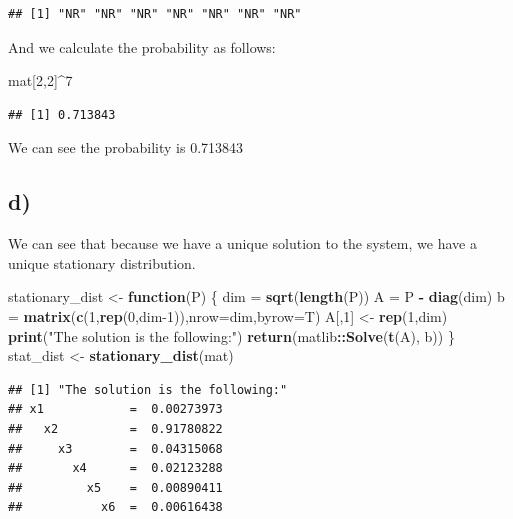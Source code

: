 \documentclass[]{article}
\newenvironment{Shaded}{\begin{snugshade}}{\end{snugshade}}
\newcommand{\ControlFlowTok}[1]{\textcolor[rgb]{0.13,0.29,0.53}{\textbf{#1}}}
\newcommand{\DataTypeTok}[1]{\textcolor[rgb]{0.13,0.29,0.53}{#1}}
\newcommand{\DecValTok}[1]{\textcolor[rgb]{0.00,0.00,0.81}{#1}}
\newcommand{\KeywordTok}[1]{\textcolor[rgb]{0.13,0.29,0.53}{\textbf{#1}}}
\newcommand{\NormalTok}[1]{#1}
\newcommand{\OperatorTok}[1]{\textcolor[rgb]{0.81,0.36,0.00}{\textbf{#1}}}
\newcommand{\StringTok}[1]{\textcolor[rgb]{0.31,0.60,0.02}{#1}}
\begin{document}
\begin{verbatim}
## [1] "NR" "NR" "NR" "NR" "NR" "NR" "NR"
\end{verbatim}

And we calculate the probability as follows:

\begin{Shaded}
\begin{Highlighting}[]
\NormalTok{mat[}\DecValTok{2}\NormalTok{,}\DecValTok{2}\NormalTok{]}\OperatorTok{^}\DecValTok{7}
\end{Highlighting}
\end{Shaded}

\begin{verbatim}
## [1] 0.713843
\end{verbatim}

We can see the probability is 0.713843

\hypertarget{d}{%
\subsection{d)}\label{d}}

We can see that because we have a unique solution to the system, we have
a unique stationary distribution.

\begin{Shaded}
\begin{Highlighting}[]
\NormalTok{stationary_dist <-}\StringTok{ }\ControlFlowTok{function}\NormalTok{(P) \{}
\NormalTok{    dim =}\StringTok{ }\KeywordTok{sqrt}\NormalTok{(}\KeywordTok{length}\NormalTok{(P))}
\NormalTok{    A =}\StringTok{ }\NormalTok{P }\OperatorTok{-}\StringTok{ }\KeywordTok{diag}\NormalTok{(dim)}
\NormalTok{    b =}\StringTok{ }\KeywordTok{matrix}\NormalTok{(}\KeywordTok{c}\NormalTok{(}\DecValTok{1}\NormalTok{,}\KeywordTok{rep}\NormalTok{(}\DecValTok{0}\NormalTok{,dim}\DecValTok{-1}\NormalTok{)),}\DataTypeTok{nrow=}\NormalTok{dim,}\DataTypeTok{byrow=}\NormalTok{T)}
\NormalTok{    A[,}\DecValTok{1}\NormalTok{] <-}\StringTok{ }\KeywordTok{rep}\NormalTok{(}\DecValTok{1}\NormalTok{,dim)}
    \KeywordTok{print}\NormalTok{(}\StringTok{"The solution is the following:"}\NormalTok{)}
    \KeywordTok{return}\NormalTok{(matlib}\OperatorTok{::}\KeywordTok{Solve}\NormalTok{(}\KeywordTok{t}\NormalTok{(A), b))}
\NormalTok{\}}
\NormalTok{stat_dist <-}\StringTok{ }\KeywordTok{stationary_dist}\NormalTok{(mat)}
\end{Highlighting}
\end{Shaded}

\begin{verbatim}
## [1] "The solution is the following:"
## x1            =  0.00273973 
##   x2          =  0.91780822 
##     x3        =  0.04315068 
##       x4      =  0.02123288 
##         x5    =  0.00890411 
##           x6  =  0.00616438
\end{verbatim}
\end{document}
